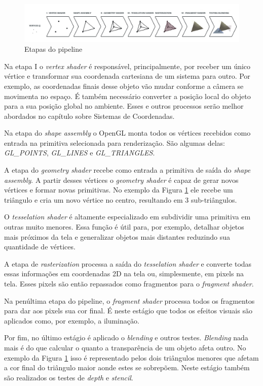 \documentclass[12pt, 
openright, 
oneside, 
a4paper,    
brazil]{facom-ufu-abntex2}
\begin{document}
\begin{figure}[H]
	\centering
	\includegraphics[width=\textwidth]{imagens/openglpipeline.png}
	\caption{Etapas do pipeline  \label{fig:pipeline}}
\end{figure}

Na etapa I o \textit{vertex shader} é responsável, principalmente, por receber um único vértice e transformar sua coordenada cartesiana de um sistema para outro. Por exemplo, as coordenadas finais desse objeto vão mudar conforme a câmera se movimenta no espaço. É também necessário converter a posição local do objeto para a sua posição global no ambiente. Esses e outros processos serão melhor abordados no capítulo sobre Sistemas de Coordenadas.

Na etapa do \textit{shape assembly} o OpenGL monta todos os vértices recebidos como entrada na primitiva selecionada para renderização. São algumas delas: \textit{GL_POINTS}, \textit{GL_LINES} e \textit{GL_TRIANGLES}.

A etapa do \textit{geometry shader} recebe como entrada a primitiva de saída do \textit{shape assembly}. A partir desses vértices o \textit{geometry shader} é capaz de gerar novos vértices e formar novas primitivas. No exemplo da Figura \ref{fig:pipeline} ele recebe um triângulo e cria um novo vértice no centro, resultando em 3 sub-triângulos.

O \textit{tesselation shader} é altamente especializado em subdividir uma primitiva em outras muito menores. Essa função é útil para, por exemplo, detalhar objetos mais próximos da tela e generalizar objetos mais distantes reduzindo sua quantidade de vértices.

A etapa de \textit{rasterization} processa a saída do \textit{tesselation shader} e converte todas essas informações em coordenadas 2D na tela ou, simplesmente, em pixels na tela. Esses pixels são então repassados como fragmentos para o \textit{fragment shader}.

Na penúltima etapa do pipeline, o \textit{fragment shader} processa todos os fragmentos para dar aos pixels sua cor final. É neste estágio que todos os efeitos visuais são aplicados como, por exemplo, a iluminação.

Por fim, no último estágio é aplicado o \textit{blending} e  outros testes. \textit{Blending} nada mais é do que calcular o quanto a transparência de um objeto afeta outro. No exemplo da Figura \ref{fig:pipeline} isso é representado pelos dois triângulos menores que afetam a cor final do triângulo maior aonde estes se sobrepõem. Neste estágio também são realizados os testes de \textit{depth} e \textit{stencil}.
\end{document}
